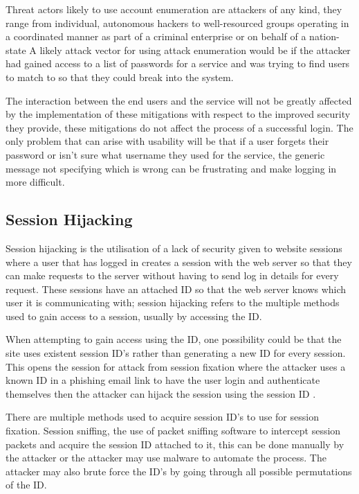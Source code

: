 \documentclass{ueacmpstyle}
\begin{document}
      Threat actors likely to use account enumeration are attackers of any kind, they range 
      from individual, autonomous hackers to well-resourced groups operating in a coordinated 
      manner as part of a criminal enterprise or on behalf of a nation-state \citep{NISTGuideToCyber}
      A likely attack vector for using attack enumeration would be if the attacker had 
      gained access to a list of passwords for a service and was trying to find users to 
      match to so that they could break into the system.

      The interaction between the end users and the service will not be greatly affected 
      by the implementation of these mitigations with respect to the improved security 
      they provide, these mitigations do not affect the process of a successful login. 
      The only problem that can arise with usability will be that if a user forgets their 
      password or isn't sure what username they used for the service, the generic message 
      not specifying which is wrong can be frustrating and make logging in more difficult. 

      \subsection{Session Hijacking}\label{sub:SessHijk}
      Session hijacking is the utilisation of a lack of security given to website sessions 
      where a user that has logged in creates a session with the web server so that they 
      can make requests to the server without having to send log in details for every 
      request. These sessions have an attached ID so that the web server knows which user 
      it is communicating with; session hijacking refers to the multiple methods used to 
      gain access to a session, usually by accessing the ID. 

      When attempting to gain access using the ID, one possibility could be that the site 
      uses existent session ID's rather than generating a new ID for every session. This 
      opens the session for attack from session fixation where the attacker uses a 
      known ID in a phishing email link to have the user login and authenticate themselves 
      then the attacker can hijack the session using the session ID \citep{OWASPSessionFixation}.

      There are multiple methods used to acquire session ID's to use for session fixation. 
      Session sniffing, the use of packet sniffing software to intercept session packets 
      and acquire the session ID attached to it, this can be done manually by the attacker 
      or the attacker may use malware to automate the process. The attacker may also brute 
      force the ID's by going through all possible permutations of the ID.
\end{document}
